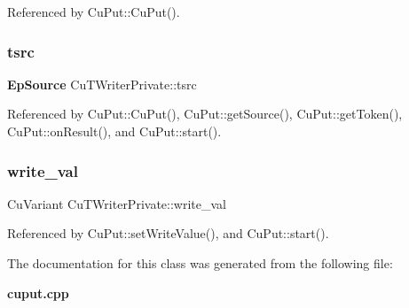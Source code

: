 Referenced by Cu\+Put\+::\+Cu\+Put().

\mbox{\label{classCuTWriterPrivate_a25fd85f0993488f1140f136e76106619}} 
\subsubsection{tsrc}
{\footnotesize\ttfamily \textbf{ Ep\+Source} Cu\+T\+Writer\+Private\+::tsrc}



Referenced by Cu\+Put\+::\+Cu\+Put(), Cu\+Put\+::get\+Source(), Cu\+Put\+::get\+Token(), Cu\+Put\+::on\+Result(), and Cu\+Put\+::start().

\mbox{\label{classCuTWriterPrivate_ac528e716bf797e0f0c7e1962162f29c7}} 
\subsubsection{write\+\_\+val}
{\footnotesize\ttfamily Cu\+Variant Cu\+T\+Writer\+Private\+::write\+\_\+val}



Referenced by Cu\+Put\+::set\+Write\+Value(), and Cu\+Put\+::start().



The documentation for this class was generated from the following file\+:\begin{DoxyCompactItemize}
\item 
\textbf{ cuput.\+cpp}\end{DoxyCompactItemize}
